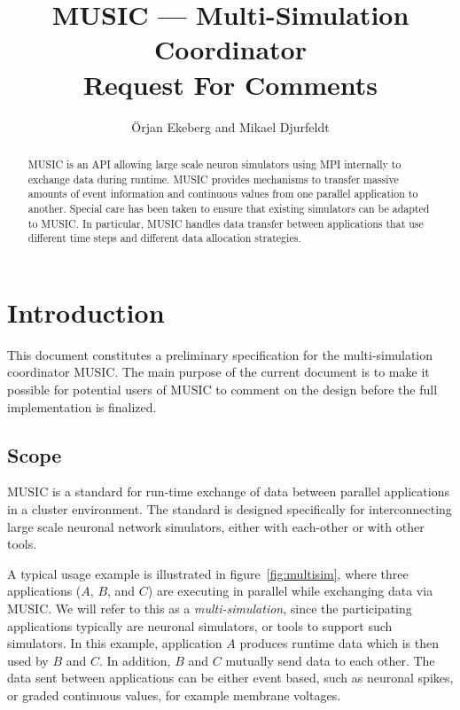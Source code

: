\documentclass[a4paper]{report}
\begin{document}
\lstset{language=C++}

\title{MUSIC --- Multi-Simulation Coordinator\\[2ex]
  Request For Comments\\}

\author{Örjan Ekeberg and Mikael Djurfeldt}

\maketitle

\begin{abstract}
  MUSIC is an API allowing large scale neuron simulators using MPI
  internally to exchange data during runtime.  MUSIC provides
  mechanisms to transfer massive amounts of event information and
  continuous values from one parallel application to another.  Special
  care has been taken to ensure that existing simulators can be
  adapted to MUSIC.  In particular, MUSIC handles data transfer
  between applications that use different time steps and different
  data allocation strategies.
\end{abstract}


\tableofcontents

\listoffigures

\chapter{Introduction}

This document constitutes a preliminary specification for the
multi-simulation coordinator MUSIC.  The main purpose of the current
document is to make it possible for potential users of MUSIC to
comment on the design before the full implementation is finalized.

\section{Scope}

MUSIC is a standard for run-time exchange of data between parallel
applications in a cluster environment.  The standard is designed
specifically for interconnecting large scale neuronal network
simulators, either with each-other or with other tools.

A typical usage example is illustrated in figure~\ref{fig:multisim},
where three applications ($A$, $B$, and $C$) are executing in parallel
while exchanging data via MUSIC.  We will refer to this as a
\emph{multi-simulation}, since the participating applications
typically are neuronal simulators, or tools to support such
simulators.  In this example, application $A$ produces runtime data
which is then used by $B$ and $C$.  In addition, $B$ and $C$ mutually
send data to each other.  The data sent between applications can be
either event based, such as neuronal spikes, or graded continuous
values, for example membrane voltages.
\end{document}
